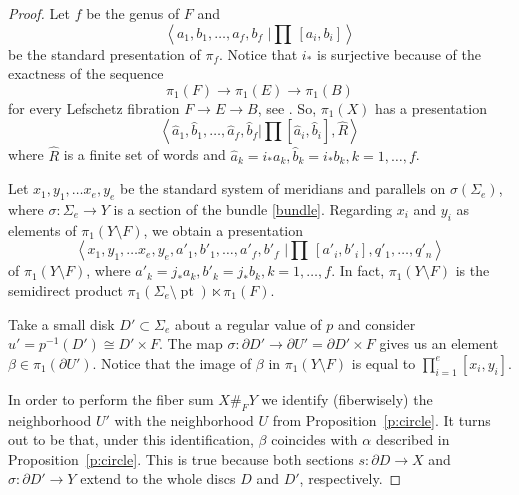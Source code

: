\documentclass[12pt]{amsart}
\theoremstyle{definition}
\theoremstyle{remark}
\numberwithin{figure}{section}
\numberwithin{table}{section}
\numberwithin{equation}{section}
\newcommand{\Si}{{\Sigma}}
\def\wh{\widehat}
\newcommand\pt{\operatorname{pt}}
\newcommand\propref{Proposition~\ref}
\begin{document}
\begin{proof} 
Let $f$ be the genus of $F$ and 
$$
\left\langle a_1,b_1,\dots,a_f,b_f\,\, \bigg\vert 
\prod\,[a_i,b_i]\right\rangle
$$
be the standard presentation of $\pi_f$. Notice that $i_*$ is surjective because of the exactness of the sequence 
\[
\pi_1(F) \to \pi_1(E) \to \pi_1(B)
\]
for every Lefschetz fibration $F \to E\to B$, see \cite[Proposition 8.1.9 and p. 510]{GS}. 
So, $\pi_1(X)$ has a presentation
$$ 
\left\langle \wh a_1,\wh b_1,\dots,\wh a_f,\wh b_f \bigg\vert \prod[\wh a_i,\wh b_i],\wh R\right\rangle
$$ 
where $\wh R$ is a finite set of words and $\wh a_k=i_*a_k,\wh b_k=i_*b_k, k=1, \ldots, f$. 


Let $x_1,y_1,\dots x_e,y_e$ be the standard system of meridians and parallels on $\sigma(\Si_e)$, where $\sigma: \Si_e \to Y$ is a section of the bundle \eqref{bundle}. Regarding $x_i$ and $y_i$ as elements of $\pi_1(Y \setminus F)$, we obtain a presentation
$$
\left\langle x_1,y_1,\dots x_e,y_e,a'_1,b'_1,\dots,a'_f,b'_f\,\, \bigg\vert 
\prod\,[a'_i,b'_i],q'_1,\dots,q'_n\right\rangle
$$ 
of $\pi_1(Y\setminus F)$, where $a'_k=j_*a_k,b'_k=j_*b_k, k=1,\ldots, f$. In fact, $\pi_1(Y\setminus F)$ is the semidirect product $\pi_1(\Si_e\setminus \pt)\ltimes \pi_1(F)$.

Take a small disk $D'\subset \Si_e$ about a regular value of $p$ and consider $u'=p^{-1}(D')\cong D'\times F$. The map $\sigma: \partial D' \to \partial U'=\partial D'\times F$ gives us an element $\beta\in \pi_1(\partial U')$. Notice that the image of $\beta$ in $\pi_1(Y\setminus F)$ is equal to $\displaystyle \prod_{i=1}^e[x_i,y_i]$.

In order to perform the fiber sum $X \#_F Y$ we identify (fiberwisely) the neighborhood $U'$ with the neighborhood $U$ from \propref{p:circle}. It turns out to be that, under this identification, $\beta$ coincides with $\alpha$ described in \propref{p:circle}. This is true because both sections $s: \partial D \to X$ and $\sigma: \partial D'\to Y$ extend to the whole discs $D$ and $D'$, respectively. 


\end{proof}
\end{document}
